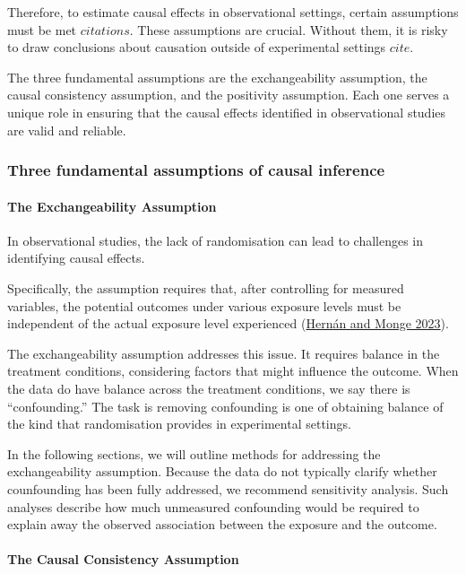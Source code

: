 \documentclass[
  singlecolumn]{article}
\let\oldparagraph\paragraph
\renewcommand{\paragraph}[1]{\oldparagraph{#1}\mbox{}}
\begin{document}
Therefore, to estimate causal effects in observational settings, certain
assumptions must be met \(citations\). These assumptions are crucial.
Without them, it is risky to draw conclusions about causation outside of
experimental settings \(cite\).

The three fundamental assumptions are the exchangeability assumption,
the causal consistency assumption, and the positivity assumption. Each
one serves a unique role in ensuring that the causal effects identified
in observational studies are valid and reliable.

\subsubsection{Three fundamental assumptions of causal
inference}\label{three-fundamental-assumptions-of-causal-inference}

\paragraph{\texorpdfstring{\textbf{The Exchangeability
Assumption}}{The Exchangeability Assumption}}\label{the-exchangeability-assumption}

In observational studies, the lack of randomisation can lead to
challenges in identifying causal effects.

Specifically, the assumption requires that, after controlling for
measured variables, the potential outcomes under various exposure levels
must be independent of the actual exposure level experienced
(\hyperref[ref-hernuxe1n2023]{Hernán and Monge 2023}).

The exchangeability assumption addresses this issue. It requires balance
in the treatment conditions, considering factors that might influence
the outcome. When the data do have balance across the treatment
conditions, we say there is ``confounding.'' The task is removing
confounding is one of obtaining balance of the kind that randomisation
provides in experimental settings.

In the following sections, we will outline methods for addressing the
exchangeability assumption. Because the data do not typically clarify
whether counfounding has been fully addressed, we recommend sensitivity
analysis. Such analyses describe how much unmeasured confounding would
be required to explain away the observed association between the
exposure and the outcome.

\paragraph{\texorpdfstring{\textbf{The Causal Consistency
Assumption}}{The Causal Consistency Assumption}}\label{the-causal-consistency-assumption}
\end{document}
